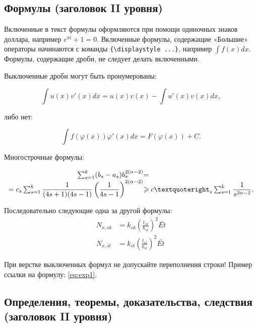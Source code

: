 \documentclass{math-mech-sci}
\begin{document}
\subsection*{Формулы (заголовок II уровня)}

Включенные в текст формулы оформляются при помощи одиночных знаков доллара, например $e^{\pi i} + 1 = 0$.
Включенные формулы, содержащие «Большие» операторы начинаются с команды \verb"{\displaystyle ...}", например ${\displaystyle\int f(x)dx}$. Формулы, содержащие дроби, не следует делать включенными.

Выключенные дроби могут быть пронумерованы:

\begin{equation}
	\label{eq:exp1}
	\int u(x)v'(x)dx=u(x)v(x)-\int u'(x)v(x)dx,
\end{equation}

либо нет:

\begin{equation*}
	\int f(\varphi(x))\varphi'(x)dx=F(\varphi(x))+C.
\end{equation*}

Многострочные формулы:

\begin{equation}\label{eq:exp2}
\begin{array}{r@{}l}
	\sum^{k}_{s=1}(b_s-a_s)b^{2(\alpha-2)}_s  &= \\
	=c_s\sum^{k}_{s=1}\displaystyle\frac{1}{(4s+1)(4s-1)}\left(\displaystyle\frac{1}{4s-1}\right)^{2(\alpha-2)}
	&\geqslant c’_s\sum^{k}_{s=1}\displaystyle\frac{1}{s^{2\alpha-2}}.
\end{array}
\end{equation}

Последовательно следующие одна за другой формулы:
\begin{align}
	N_{x,sk} &= k_{sk}\left(\frac{t_{sk}}{b_{sk}}\right)^{2}\bar{Et}\\
	N_{x,st} &= k_{st}\left(\frac{t_{st}}{b_{st}}\right)^{2}\bar{Et}
\end{align}

При верстке выключенных формул не допускайте переполнения строки! Пример ссылки на формулу: \eqref{eq:exp1}.

\subsection*{Определения, теоремы, доказательства, следствия (заголовок II уровня)}
\end{document}
